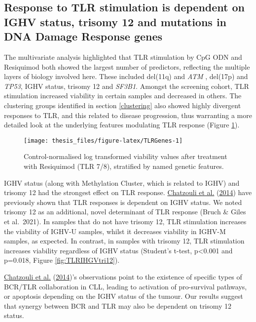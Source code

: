 \documentclass[11pt, a4paper, twosided]{book}
\begin{document}
\hypertarget{response-to-tlr-stimulation-is-dependent-on-ighv-status-trisomy-12-and-mutations-in-dna-damage-response-genes}{%
\subsection{Response to TLR stimulation is dependent on IGHV status, trisomy 12 and mutations in DNA Damage Response genes}\label{response-to-tlr-stimulation-is-dependent-on-ighv-status-trisomy-12-and-mutations-in-dna-damage-response-genes}}

The multivariate analysis highlighted that TLR stimulation by CpG ODN and Resiquimod both showed the largest number of predictors, reflecting the multiple layers of biology involved here. These included del(11q) and \emph{ATM} , del(17p) and \emph{TP53}, IGHV status, trisomy 12 and \emph{SF3B1}. Amongst the screening cohort, TLR stimulation increased viability in certain samples and decreased in others. The clustering groups identified in section \ref{clustering} also showed highly divergent responses to TLR, and this related to disease progression, thus warranting a more detailed look at the underlying features modulating TLR response (Figure \ref{fig:TLRGenes}).


\begin{figure}

{\centering \texttt{[image: thesis\_files/figure-latex/TLRGenes-1]} 

}

\caption{Control-normalised log transformed viability values after treatment with Resiquimod (TLR 7/8), stratified by named genetic features.}\label{fig:TLRGenes}
\end{figure}
IGHV status (along with Methylation Cluster, which is related to IGHV) and trisomy 12 had the strongest effect on TLR response. \protect\hyperlink{ref-Chatzouli2014}{Chatzouli et al.} (\protect\hyperlink{ref-Chatzouli2014}{2014}) have previously shown that TLR responses is dependent on IGHV status. We noted trisomy 12 as an additional, novel determinant of TLR response (Bruch \& Giles et al.~2021). In samples that do not have trisomy 12, TLR stimulation increases the viability of IGHV-U samples, whilst it decreases viability in IGHV-M samples, as expected. In contrast, in samples with trisomy 12, TLR stimulation increases viability regardless of IGHV status (Student's t-test, p\textless0.001 and p=0.018, Figure \ref{fig:TLRIHGVtri12}).

\protect\hyperlink{ref-Chatzouli2014}{Chatzouli et al.} (\protect\hyperlink{ref-Chatzouli2014}{2014})'s observations point to the existence of specific types of BCR/TLR collaboration in CLL, leading to activation of pro-survival pathways, or apoptosis depending on the IGHV status of the tumour. Our results suggest that synergy between BCR and TLR may also be dependent on trisomy 12 status.
\end{document}
